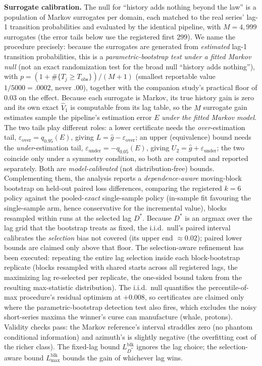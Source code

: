 \documentclass[acmsmall,screen,review,anonymous]{acmart}
\begin{document}
\textbf{Surrogate calibration.} The null for ``history adds nothing beyond
the law'' is a population of Markov surrogates per domain, each matched
to the real series' lag-1 transition probabilities and evaluated by the
identical pipeline, with $M=4{,}999$ surrogates (the error tails below use the registered
first $299$). We name the procedure
precisely: because the surrogates are generated from \emph{estimated}
lag-1 transition probabilities, this is a \emph{parametric-bootstrap test
under a fitted Markov null} (not an exact randomization test for the
broad null ``history adds nothing''), with
$p=(1+\#\{T_j\ge T_{\mathrm{obs}}\})/(M+1)$ (smallest reportable value
$1/5000=.0002$, never $.00$), together with the
companion study's practical floor of $0.03$ on the effect. Because each
surrogate is Markov, its true history gain is zero and its own exact
$\widehat V_1$ is computable from its lag table, so the $M$ surrogate gain
estimates sample the pipeline's estimation error $E$ \emph{under the
fitted Markov model}. The two tails play different roles: a lower
certificate needs the \emph{over}-estimation tail,
$\varepsilon_{\mathrm{over}}=q_{0.95}(E)$, giving
$L=\hat g-\varepsilon_{\mathrm{over}}$; an upper (equivalence) bound needs
the \emph{under}-estimation tail,
$\varepsilon_{\mathrm{under}}=-q_{0.05}(E)$, giving
$U_2=\hat g+\varepsilon_{\mathrm{under}}$; the two coincide only under a
symmetry condition, so both are computed and reported separately. Both
are \emph{model-calibrated} (not distribution-free) bounds. Complementing
them, the analysis reports a \emph{dependence-aware} moving-block
bootstrap on held-out paired loss differences, comparing the registered $k{=}6$
policy against the pooled-\emph{exact} single-sample policy (in-sample
fit favouring the single-sample arm, hence conservative for the
incremental value), blocks resampled within runs at the selected lag
$D^*$. Because $D^*$ is an argmax over the lag grid that the bootstrap
treats as fixed, the i.i.d.\ null's paired interval calibrates the
\emph{selection} bias not covered (its upper end $\approx0.02$); paired
lower bounds are claimed only above that floor. The selection-aware
refinement has been executed: repeating the entire lag selection inside
each block-bootstrap replicate (blocks resampled with shared starts
across all registered lags, the maximizing lag re-selected per replicate,
the one-sided bound taken from the resulting max-statistic distribution).
The i.i.d.\ null quantifies the percentile-of-max procedure's residual
optimism at $+0.008$, so certificates are claimed only where the
parametric-bootstrap detection test also fires, which excludes the
noisy short-series maxima the winner's curse can manufacture (whale,
protons). Validity checks pass:
the Markov reference's interval straddles zero (no phantom conditional
information) and azimuth's is slightly negative (the overfitting cost of
the richer class). The fixed-lag bound $L^{\mathrm{blk}}_{D^*}$ ignores
the lag choice; the selection-aware bound $L^{\mathrm{blk}}_{\max}$ bounds
the gain of whichever lag wins.
\end{document}
